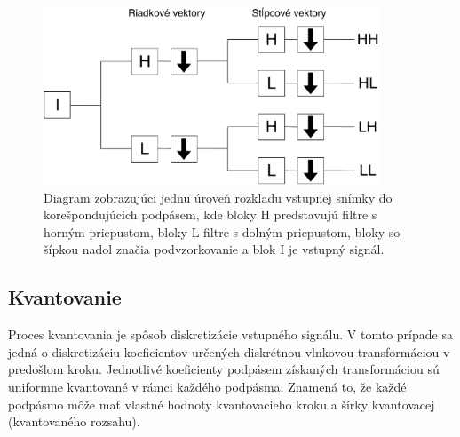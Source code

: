   \begin{figure}[]
    \centering
    \includegraphics[width=10cm]{obrazky-figures/DWT_level.pdf}
    \caption{Diagram zobrazujúci jednu úroveň rozkladu vstupnej snímky do korešpondujúcich podpásem, kde bloky H predstavujú filtre s horným priepustom,
    bloky L filtre s dolným priepustom, bloky so šípkou nadol značia podvzorkovanie a blok I je vstupný signál.}
    \label{obr:DWT_uroven}
  \end{figure}

  \subsection{Kvantovanie}
  Proces kvantovania je spôsob diskretizácie vstupného signálu. V tomto prípade sa jedná o diskretizáciu koeficientov určených diskrétnou vlnkovou
  transformáciou v predošlom kroku. Jednotlivé koeficienty podpásem získaných transformáciou sú uniformne kvantované v rámci každého podpásma.
  Znamená to, že každé podpásmo môže mať vlastné hodnoty kvantovacieho kroku a šírky kvantovacej  (kvantovaného rozsahu). 

